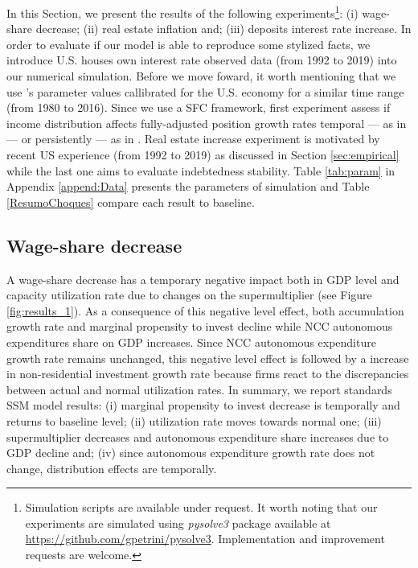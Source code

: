 \documentclass[11pt]{article}
\begin{document}
In this Section, we present the results of the following experiments\footnote{Simulation scripts are available under request. It worth noting that our experiments are simulated using \emph{pysolve3} package available at \url{https://github.com/gpetrini/pysolve3}. Implementation and improvement requests are welcome.}: 
    (i) wage-share decrease;
    (ii) real estate inflation and;
    (iii) deposits interest rate increase.
In order to evaluate if our model is able to reproduce some stylized facts, we introduce U.S. houses own interest rate observed data (from 1992 to 2019) into our numerical simulation.
Before we move foward, it worth mentioning that we use \citeauthor*{fazzari-2020-deman-led}'s  \citeyear{fazzari-2020-deman-led} parameter values callibrated for the U.S. economy for a similar time range (from 1980 to 2016).
Since we use a SFC framework, first experiment assess if income distribution affects fully-adjusted position growth rates temporal --- as in \textcite{mandarino-2020-worker-debt} --- or persistently ---  as in \textcite{brochier_supermultiplier_2018}.
Real estate increase experiment is motivated by recent US experience (from 1992 to 2019) as discussed in Section \ref{sec:empirical} while the last one aims to evaluate indebtedness stability.
Table \ref{tab:param} in Appendix \ref{append:Data} presents the parameters of simulation and Table \ref{ResumoChoques} compare each result to baseline.
\subsection{Wage-share decrease}
\label{sec:org8b1e8b2}
\label{sec:Exp1}

A wage-share decrease has a temporary negative impact both in GDP level and capacity utilization rate due to changes on the supermultiplier (see Figure \ref{fig:results_1}).
As a consequence of this negative level effect, both accumulation growth rate and marginal propensity to invest decline while NCC autonomous expenditures share on GDP increases.
Since NCC autonomous expenditure growth rate remains unchanged, this negative level effect is followed by a increase in non-residential investment growth rate because firms react to the discrepancies between actual and normal utilization rates.
In summary, we report standards SSM model results:
    (i) marginal propensity to invest decrease is temporally and returns to baseline level;
    (ii) utilization rate moves towards normal one;
    (iii) supermultiplier decreases and autonomous expenditure share increases due to GDP decline and; 
    (iv) since autonomous expenditure growth rate does not change, distribution effects are temporally.
\end{document}
